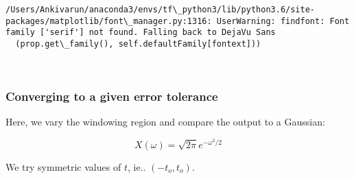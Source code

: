 \documentclass[11pt]{article}
\begin{document}
    \begin{Verbatim}[commandchars=\\\{\}]
/Users/Ankivarun/anaconda3/envs/tf\_python3/lib/python3.6/site-packages/matplotlib/font\_manager.py:1316: UserWarning: findfont: Font family ['serif'] not found. Falling back to DejaVu Sans
  (prop.get\_family(), self.defaultFamily[fontext]))

    \end{Verbatim}

    \begin{center}
    \end{center}
    { \hspace*{\fill} \\}
    
    \subsubsection{Converging to a given error
tolerance}\label{converging-to-a-given-error-tolerance}

Here, we vary the windowing region and compare the output to a Gaussian:

\[ X(\omega)= \sqrt{2\pi }e^{-\omega^{2}/2} \]

We try symmetric values of \(t\), ie.. \((-t_o,t_o)\).
\end{document}
